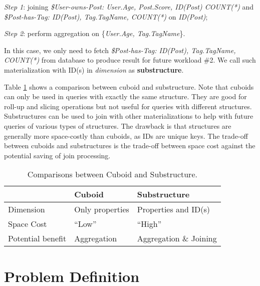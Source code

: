 \noindent\emph{Step 1}: joining \textit{\$User-owns-Post: User.Age, Post.Score, ID(Post) COUNT(*)} and \textit{\$Post-has-Tag: ID(Post), Tag.TagName, COUNT(*)} on \emph{ID(Post)};

\noindent\emph{Step 2}: perform aggregation on \{\emph{User.Age, Tag.TagName}\}. 

In this case, we only need to fetch \textit{\$Post-has-Tag: ID(Post), Tag.TagName, COUNT(*)} from database to produce result for future workload \#2. We call such materialization with ID(s) in \textit{dimension} as \textbf{substructure}. 

Table \ref{Table:3:1} shows a comparison between cuboid and substructure. Note that cuboids can only be used in queries with exactly the same structure. They are good for roll-up and slicing operations but not useful for queries with different structures. Substructures can be used to join with other materializations to help with future queries of various types of structures. The drawback is that structures are generally more space-costly than cuboids, as IDs are unique keys. The trade-off between cuboids and substructures is the trade-off between space cost against the potential saving of join processing.


\begin{table}
	\footnotesize
	\begin {center}
	\begin{tabular}{ | l | l | l |}
		\hline
		&Cuboid&Substructure\\ \hline
		Dimension& Only properties& Properties and ID(s)\\ \hline
		Space Cost& ``Low''&``High''\\ \hline
		Potential benefit& Aggregation& Aggregation \& Joining\\ \hline
	\end{tabular}
	\end {center}
	\caption{Comparisons between Cuboid and Substructure.}
	\label{Table:3:1}
\end{table}


\section{Problem Definition}
\label{sec:Problem Definition}

